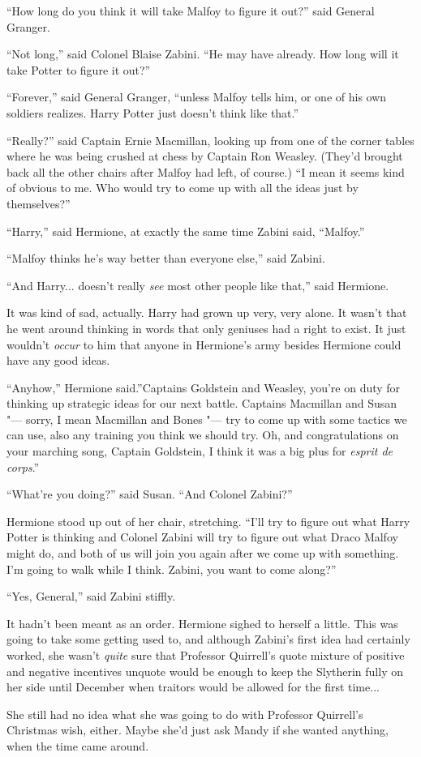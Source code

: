 ``How long do you think it will take Malfoy to figure it out?'' said
General Granger.

``Not long,'' said Colonel Blaise Zabini. ``He may have already. How
long will it take Potter to figure it out?''

``Forever,'' said General Granger, ``unless Malfoy tells him, or one of
his own soldiers realizes. Harry Potter just doesn't think like that.''

``Really?'' said Captain Ernie Macmillan, looking up from one of the
corner tables where he was being crushed at chess by Captain Ron
Weasley. (They'd brought back all the other chairs after Malfoy had
left, of course.) ``I mean it seems kind of obvious to me. Who would try
to come up with all the ideas just by themselves?''

``Harry,'' said Hermione, at exactly the same time Zabini said,
``Malfoy.''

``Malfoy thinks he's way better than everyone else,'' said Zabini.

``And Harry... doesn't really \emph{see} most other people like
that,'' said Hermione.

It was kind of sad, actually. Harry had grown up very, very alone. It
wasn't that he went around thinking in words that only geniuses had a
right to exist. It just wouldn't \emph{occur} to him that anyone in
Hermione's army besides Hermione could have any good ideas.

``Anyhow,'' Hermione said.''Captains Goldstein and Weasley, you're on
duty for thinking up strategic ideas for our next battle. Captains
Macmillan and Susan "--- sorry, I mean Macmillan and Bones "--- try to come up
with some tactics we can use, also any training you think we should try.
Oh, and congratulations on your marching song, Captain Goldstein, I
think it was a big plus for \emph{esprit de corps}.''

``What're you doing?'' said Susan. ``And Colonel Zabini?''

Hermione stood up out of her chair, stretching. ``I'll try to figure out
what Harry Potter is thinking and Colonel Zabini will try to figure out
what Draco Malfoy might do, and both of us will join you again after we
come up with something. I'm going to walk while I think. Zabini, you
want to come along?''

``Yes, General,'' said Zabini stiffly.

It hadn't been meant as an order. Hermione sighed to herself a little.
This was going to take some getting used to, and although Zabini's first
idea had certainly worked, she wasn't \emph{quite} sure that Professor
Quirrell's quote mixture of positive and negative incentives unquote
would be enough to keep the Slytherin fully on her side until December
when traitors would be allowed for the first time...

She still had no idea what she was going to do with Professor Quirrell's
Christmas wish, either. Maybe she'd just ask Mandy if she wanted
anything, when the time came around.
